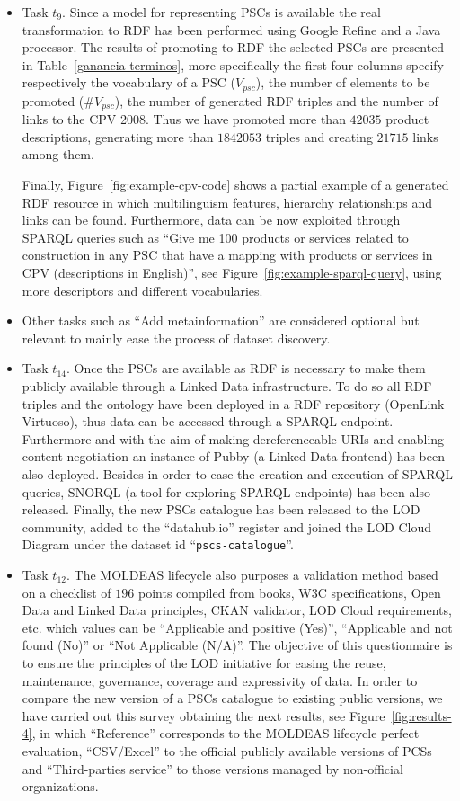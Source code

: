 \begin{itemize}
\item Task $t_9$. Since a model for representing PSCs is available the real transformation to RDF has been performed using Google Refine 
and a Java processor. The results of promoting to RDF the selected PSCs are presented in Table~\ref{ganancia-terminos}, 
more specifically the first four columns specify respectively the vocabulary of a PSC ($V_{psc}$), the number of elements 
to be promoted (\#$V_{psc}$), the number of generated RDF triples and the number of links to the CPV 2008. 
Thus we have promoted more than $42035$ product descriptions, generating more than $1842053$ triples and creating $21715$ 
links among them. 

Finally, Figure~\ref{fig:example-cpv-code} shows a partial example of a generated RDF resource in which multilinguism features, 
hierarchy relationships and links can be found. Furthermore, data can be now exploited through SPARQL queries 
such as ``Give me 100 products or services related to construction in any PSC that have a mapping with products or 
services in CPV (descriptions in English)'', see Figure~\ref{fig:example-sparql-query}, using more descriptors and 
different vocabularies.

\item Other tasks such as ``Add metainformation'' are considered optional but relevant to mainly ease the process of dataset discovery.

\item Task $t_{14}$. Once the PSCs are available as RDF is necessary to make them publicly available through a Linked Data infrastructure. To 
do so all RDF triples and the ontology have been deployed in a RDF repository (OpenLink Virtuoso), thus data can be accessed through 
a SPARQL endpoint. Furthermore and with the aim of making dereferenceable URIs and enabling content negotiation an instance 
of Pubby (a Linked Data frontend) has been also deployed. Besides in order to ease the creation and execution of SPARQL queries, SNORQL 
(a tool for exploring SPARQL endpoints) has been also released. Finally, the new PSCs catalogue has been released to the 
LOD community, added to the ``datahub.io'' register and joined the LOD Cloud Diagram under the dataset id ``\texttt{pscs-catalogue}''.

\item Task $t_{12}$. The MOLDEAS lifecycle also purposes a validation method based on a checklist of $196$ points compiled from books, 
W3C specifications, Open Data and Linked Data principles, CKAN validator, LOD Cloud requirements, etc. which values can be 
``Applicable and positive (Yes)'', ``Applicable and not found (No)'' or ``Not Applicable (N/A)''. The objective of this questionnaire is 
to ensure the principles of the LOD initiative for easing the reuse, maintenance, governance, coverage and expressivity of data. In order to compare 
the new version of a PSCs catalogue to existing public versions, we have carried out this survey obtaining the next results, 
see Figure~\ref{fig:results-4}, in which ``Reference'' corresponds to the MOLDEAS lifecycle perfect evaluation, ``CSV/Excel'' to the official publicly 
available versions of PCSs and ``Third-parties service'' to those versions managed by non-official organizations. 


\end{itemize}
